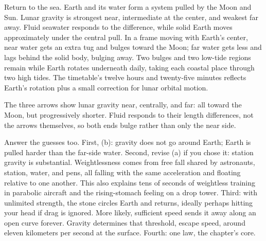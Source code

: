 Return to the sea. Earth and its water form a system pulled by the Moon and Sun. Lunar gravity is strongest near, intermediate at the center, and weakest far away. Fluid seawater responds to the difference, while solid Earth moves approximately under the central pull. In a frame moving with Earth's center, near water gets an extra tug and bulges toward the Moon; far water gets less and lags behind the solid body, bulging away. Two bulges and two low-tide regions remain while Earth rotates underneath daily, taking each coastal place through two high tides. The timetable's twelve hours and twenty-five minutes reflects Earth's rotation plus a small correction for lunar orbital motion.

\begin{center}
\end{center}

The three arrows show lunar gravity near, centrally, and far: all toward the Moon, but progressively shorter. Fluid responds to their length differences, not the arrows themselves, so both ends bulge rather than only the near side.

Answer the guesses too. First, (b): gravity does not go around Earth; Earth is pulled harder than the far-side water. Second, revise (a) if you chose it: station gravity is substantial. Weightlessness comes from free fall shared by astronauts, station, water, and pens, all falling with the same acceleration and floating relative to one another. This also explains tens of seconds of weightless training in parabolic aircraft and the rising-stomach feeling on a drop tower. Third: with unlimited strength, the stone circles Earth and returns, ideally perhaps hitting your head if drag is ignored. More likely, sufficient speed sends it away along an open curve forever. Gravity determines that threshold, escape speed, around eleven kilometers per second at the surface. Fourth: one law, the chapter's core.

